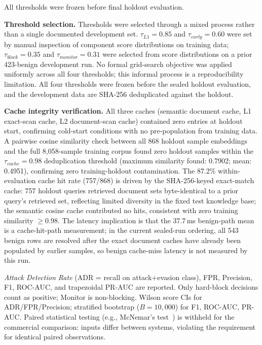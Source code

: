 ﻿\documentclass[conference]{IEEEtran}
\begin{document}
All thresholds were frozen before final holdout evaluation.

\textbf{Threshold selection.}
Thresholds were selected through a mixed process rather than a single
documented development set.
$\tau_{L1}=0.85$ and $\tau_{early}=0.60$ were set by manual inspection of
component score distributions on training data; $\tau_{block}=0.35$ and
$\tau_{monitor}=0.31$ were selected from score distributions on a prior
423-benign development run.
No formal grid-search objective was applied uniformly across all four
thresholds; this informal process is a reproducibility limitation.
All four thresholds were frozen before the sealed holdout evaluation, and the
development data are SHA-256 deduplicated against the holdout.

\textbf{Cache integrity verification.}
All three caches (semantic document cache, L1 exact-scan cache, L2
document-scan cache) contained zero entries at holdout start, confirming
cold-start conditions with no pre-population from training data.
A pairwise cosine similarity check between all 868 holdout sample embeddings
and the full 8,058-sample training corpus found zero holdout samples within
the $\tau_{cache} = 0.98$ deduplication threshold (maximum similarity found:
0.7902; mean: 0.4951), confirming zero training-holdout contamination.
The 87.2\% within-evaluation cache hit rate (757/868) is driven by the
SHA-256-keyed exact-match cache: 757 holdout queries retrieved document sets
byte-identical to a prior query's retrieved set, reflecting limited diversity
in the fixed test knowledge base; the semantic cosine cache contributed no
hits, consistent with zero training similarity $\geq 0.98$.
The latency implication is that the 37.7\,ms benign-path mean is a
cache-hit-path measurement; in the current sealed-run ordering, all 543 benign
rows are resolved after the exact document caches have already been populated
by earlier samples, so benign cache-miss latency is not measured by this run.

\emph{Attack Detection Rate} (ADR = recall on attack+evasion class), FPR,
Precision, F1, ROC-AUC, and trapezoidal PR-AUC are reported.
Only hard-block decisions count as positive; Monitor is non-blocking.
Wilson score CIs for ADR/FPR/Precision; stratified bootstrap ($B=10{,}000$)
for F1, ROC-AUC, PR-AUC.
Paired statistical testing (e.g., McNemar's test~\cite{mcnemar1947}) is
withheld for the commercial comparison: inputs differ between systems,
violating the requirement for identical paired observations.
\end{document}
